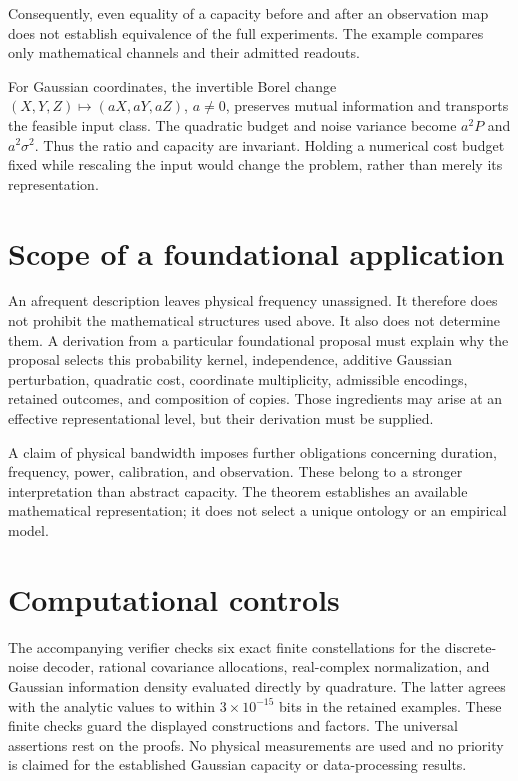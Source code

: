 \documentclass{article}
\begin{document}
Consequently, even equality of a capacity before and after an observation map does not establish equivalence of the full experiments. The example compares only mathematical channels and their admitted readouts.

For Gaussian coordinates, the invertible Borel change \((X,Y,Z)\mapsto(aX,aY,aZ)\), \(a\ne0\), preserves mutual information and transports the feasible input class. The quadratic budget and noise variance become \(a^2P\) and \(a^2\sigma^2\). Thus the ratio and capacity are invariant. Holding a numerical cost budget fixed while rescaling the input would change the problem, rather than merely its representation.

\section{Scope of a foundational application}
An afrequent description leaves physical frequency unassigned. It therefore does not prohibit the mathematical structures used above. It also does not determine them. A derivation from a particular foundational proposal must explain why the proposal selects this probability kernel, independence, additive Gaussian perturbation, quadratic cost, coordinate multiplicity, admissible encodings, retained outcomes, and composition of copies. Those ingredients may arise at an effective representational level, but their derivation must be supplied.

A claim of physical bandwidth imposes further obligations concerning duration, frequency, power, calibration, and observation. These belong to a stronger interpretation than abstract capacity. The theorem establishes an available mathematical representation; it does not select a unique ontology or an empirical model.

\section{Computational controls}
The accompanying verifier checks six exact finite constellations for the discrete-noise decoder, rational covariance allocations, real-complex normalization, and Gaussian information density evaluated directly by quadrature. The latter agrees with the analytic values to within \(3\times10^{-15}\) bits in the retained examples. These finite checks guard the displayed constructions and factors. The universal assertions rest on the proofs. No physical measurements are used and no priority is claimed for the established Gaussian capacity or data-processing results.
\end{document}

